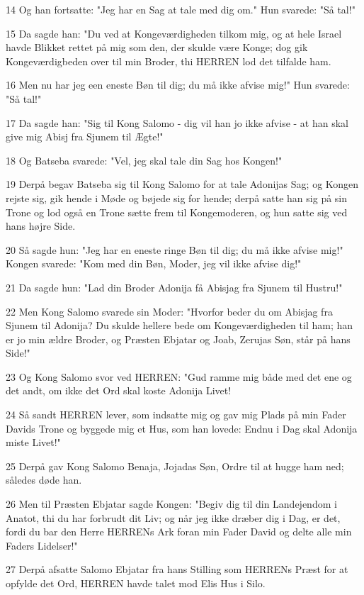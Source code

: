 \par 14 Og han fortsatte: "Jeg har en Sag at tale med dig om." Hun svarede: "Så tal!"
\par 15 Da sagde han: "Du ved at Kongeværdigheden tilkom mig, og at hele Israel havde Blikket rettet på mig som den, der skulde være Konge; dog gik Kongeværdigbeden over til min Broder, thi HERREN lod det tilfalde ham.
\par 16 Men nu har jeg een eneste Bøn til dig; du må ikke afvise mig!" Hun svarede: "Så tal!"
\par 17 Da sagde han: "Sig til Kong Salomo - dig vil han jo ikke afvise - at han skal give mig Abisj fra Sjunem til Ægte!"
\par 18 Og Batseba svarede: "Vel, jeg skal tale din Sag hos Kongen!"
\par 19 Derpå begav Batseba sig til Kong Salomo for at tale Adonijas Sag; og Kongen rejste sig, gik hende i Møde og bøjede sig for hende; derpå satte han sig på sin Trone og lod også en Trone sætte frem til Kongemoderen, og hun satte sig ved hans højre Side.
\par 20 Så sagde hun: "Jeg har en eneste ringe Bøn til dig; du må ikke afvise mig!" Kongen svarede: "Kom med din Bøn, Moder, jeg vil ikke afvise dig!"
\par 21 Da sagde hun: "Lad din Broder Adonija få Abisjag fra Sjunem til Hustru!"
\par 22 Men Kong Salomo svarede sin Moder: "Hvorfor beder du om Abisjag fra Sjunem til Adonija? Du skulde hellere bede om Kongeværdigheden til ham; han er jo min ældre Broder, og Præsten Ebjatar og Joab, Zerujas Søn, står på hans Side!"
\par 23 Og Kong Salomo svor ved HERREN: "Gud ramme mig både med det ene og det andt, om ikke det Ord skal koste Adonija Livet!
\par 24 Så sandt HERREN lever, som indsatte mig og gav mig Plads på min Fader Davids Trone og byggede mig et Hus, som han lovede: Endnu i Dag skal Adonija miste Livet!"
\par 25 Derpå gav Kong Salomo Benaja, Jojadas Søn, Ordre til at hugge ham ned; således døde han.
\par 26 Men til Præsten Ebjatar sagde Kongen: "Begiv dig til din Landejendom i Anatot, thi du har forbrudt dit Liv; og når jeg ikke dræber dig i Dag, er det, fordi du bar den Herre HERRENs Ark foran min Fader David og delte alle min Faders Lidelser!"
\par 27 Derpå afsatte Salomo Ebjatar fra hans Stilling som HERRENs Præst for at opfylde det Ord, HERREN havde talet mod Elis Hus i Silo.
